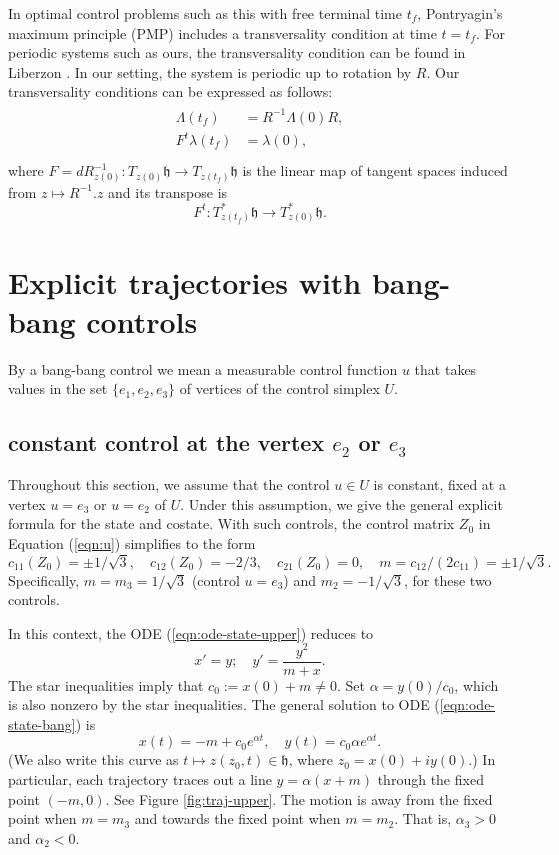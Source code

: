 \documentclass{article}
\theoremstyle{remark}
\def\h{\mathfrak h}
\begin{document}
In optimal control problems such as this with  free terminal time $t_f$,
Pontryagin's maximum principle (PMP) includes a transversality
condition at time $t=t_f$.  For periodic systems such as ours, the
transversality condition can be found in Liberzon
\cite[p134]{liberzon2012calculus}.  In our setting, the system is
periodic up to rotation by $R$.  Our transversality conditions can be
expressed as follows:
\begin{align}\label{eqn:transverse}
\begin{split}
\Lambda(t_f) &= R^{-1} \Lambda(0) R,\\
F^t\lambda(t_f) &= \lambda(0),\\
\end{split}
\end{align}
where $F=dR^{-1}_{z(0)}:T_{z(0)}\h\to T_{z(t_f)}\h$ is the 
linear map of tangent spaces
induced from $z\mapsto R^{-1}.z$ and 
 its transpose is 
\[
F^t:T^*_{z(t_f)}\h\to T^*_{z(0)}\h.
\]


\section{Explicit trajectories with bang-bang controls}

By a bang-bang control we mean a measurable control function $u$ that
takes values in the set $\{e_1,e_2,e_3\}$ of vertices of the control
simplex $U$.

\subsection{constant control at the vertex $e_2$ or $e_3$}
\label{sec:e2e3}

Throughout this section, we assume that the control $u\in U$ is
constant, fixed at a vertex $u=e_3$ or $u=e_2$ of $U$.
Under this assumption, we give
the general explicit formula for the state and costate.  
With such controls, the control matrix $Z_0$ in Equation
(\ref{eqn:u}) simplifies to the form
\[
c_{11}(Z_0) = \pm 1/\sqrt{3},\quad c_{12}(Z_0) = -2/3,
\quad c_{21}(Z_0) = 0,\quad m = c_{12}/(2 c_{11}) = \pm 1/\sqrt{3}.
\]
Specifically, $m=m_3=1/\sqrt{3}$ (control $u=e_3$) and $m_2= - 1/\sqrt{3}$,
for these two controls.


In this context, the ODE (\ref{eqn:ode-state-upper}) reduces to
\begin{equation}\label{eqn:ode-state-bang}
x'  = y;\quad y' = \frac{y^2}{m + x}.
\end{equation}
The star inequalities imply that $c_0:= x(0)+m\ne 0$. Set $\alpha =
y(0)/c_0$, which is also nonzero by the star inequalities.  The
general solution to ODE (\ref{eqn:ode-state-bang}) is
\begin{equation}\label{eqn:alpha}
x(t) = -m + c_0 e^{\alpha t},\quad y(t) = c_0 \alpha e^{\alpha t}.
\end{equation}
(We also write this curve as $t\mapsto z(z_0,t)\in \h$, where
$z_0=x(0)+iy(0)$.)  In particular, each trajectory traces out a line
$y = \alpha (x+m)$ through the fixed point $(-m,0)$.  See Figure
\ref{fig:traj-upper}.  The motion is away from the fixed point when
$m=m_3$ and towards the fixed point when $m=m_2$.  That is,
$\alpha_3>0$ and $\alpha_2<0$.
\end{document}
